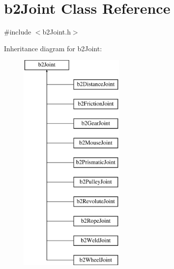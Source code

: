\hypertarget{classb2_joint}{\section{b2\-Joint Class Reference}
\label{classb2_joint}
}


{\ttfamily \#include $<$b2\-Joint.\-h$>$}

Inheritance diagram for b2\-Joint\-:\begin{figure}[H]
\begin{center}
\leavevmode
\includegraphics[height=11.000000cm]{classb2_joint}
\end{center}
\end{figure}

